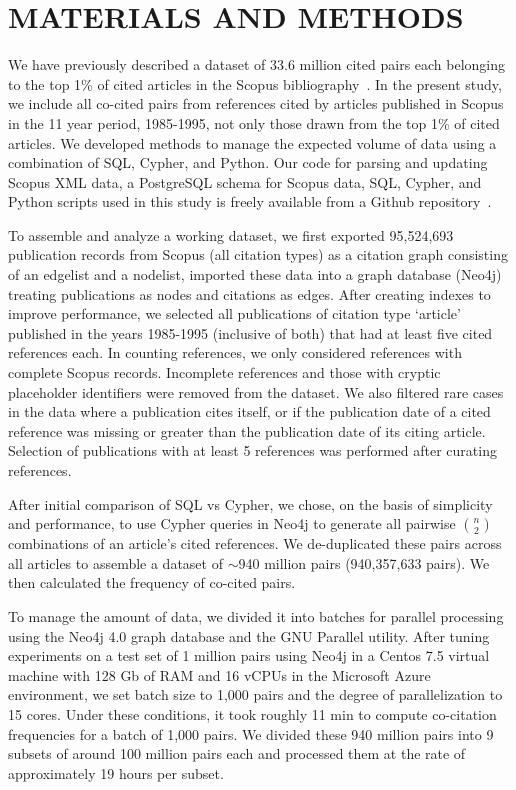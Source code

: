 \documentclass[utf8]{frontiersSCNS}
\begin{document}
\section{MATERIALS AND METHODS}

We have previously described a dataset of 33.6 million cited pairs each belonging to the top 1\% of cited articles in the Scopus bibliography~\citep[Figure~2]{devarakonda_2020}. In the present study, we include all co-cited pairs from references cited by articles published in Scopus in the 11 year period, 1985-1995, not only those drawn from the top 1\% of cited articles. We developed methods to manage the expected volume of data using a combination of SQL, Cypher, and Python. Our code for parsing and updating Scopus XML data, a PostgreSQL schema for Scopus data, SQL, Cypher, and Python scripts used in this study is freely available from a Github repository~\citep{Korobskiy2019}.

To assemble and analyze a working dataset, we first exported 95,524,693 publication records from Scopus (all citation types) as a citation graph consisting of an edgelist and a nodelist, imported these data into a graph database (Neo4j) treating publications as nodes and citations as edges. After creating indexes to improve performance, we selected all publications of citation type `article' published in the years 1985-1995 (inclusive of both) that had at least five cited references each. In counting references, we only considered references with complete Scopus records. Incomplete references and those with cryptic placeholder identifiers were removed from the dataset. We also filtered rare cases in the data where a publication cites itself, or if the publication date of a cited reference was missing or greater than the publication date of its citing article. Selection of publications with at least 5 references was performed after curating references.

After initial comparison of SQL vs Cypher, we chose, on the basis of simplicity and performance, to use Cypher queries in Neo4j to generate all pairwise $n\choose 2$ combinations of an article's cited references. We de-duplicated these pairs across all articles to assemble a dataset of $\sim$940 million pairs (940,357,633 pairs). We then calculated the frequency of co-cited pairs.  

To manage the amount of data, we divided it into batches for parallel processing using the Neo4j 4.0 graph database and the GNU Parallel utility.  After tuning experiments on a test set of 1 million pairs using Neo4j in a Centos 7.5 virtual machine with 128 Gb of RAM and 16 vCPUs in the Microsoft Azure environment, we set batch size to 1,000 pairs and the degree of parallelization to 15 cores. Under these conditions, it took roughly 11 min to compute co-citation frequencies for a batch of 1,000 pairs. We divided these 940 million pairs into 9 subsets of around 100 million pairs each and processed them at the rate of approximately 19 hours per subset.  
\end{document}
